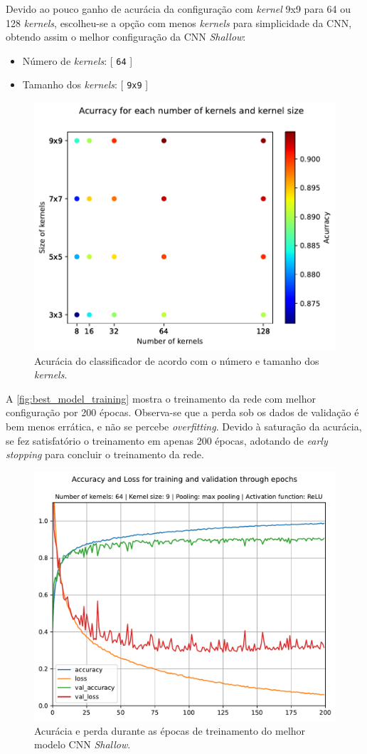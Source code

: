 Devido ao pouco ganho de acurácia da configuração com \textit{kernel} 9x9 para 64 ou 128 \textit{kernels}, escolheu-se a opção com menos \textit{kernels} para simplicidade da CNN, obtendo assim o melhor configuração da CNN \textit{Shallow}: 

\begin{itemize}
	\item Número de \textit{kernels}: [ \texttt{64} ]
	\item Tamanho dos \textit{kernels}: [ \texttt{9x9} ]
\end{itemize}

\begin{figure}[H]
\centering
\includegraphics[width=0.75\linewidth]{../../plot/cnn_shallow/hiper_parameters_search}
\caption{Acurácia do classificador de acordo com o número e tamanho dos \textit{kernels}.}
\label{fig:hiper_parameters_search}
\end{figure}

A \autoref{fig:best_model_training} mostra o treinamento da rede com melhor configuração por 200 épocas. Observa-se que a perda sob os dados de validação é bem menos errática, e não se percebe \textit{overfitting}. Devido à saturação da acurácia, se fez satisfatório o treinamento em apenas 200 épocas, adotando de \textit{early stopping} para concluir o treinamento da rede.

\begin{figure}[H]
\centering
\includegraphics[width=0.65\linewidth]{../../plot/cnn_shallow/best_model_training}
\caption{Acurácia e perda durante as épocas de treinamento do melhor modelo CNN \textit{Shallow}.}
\label{fig:best_model_training}
\end{figure}


